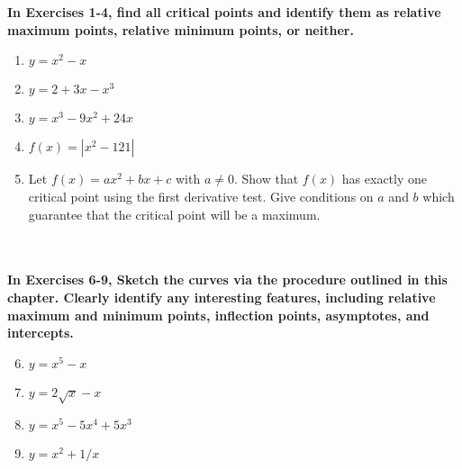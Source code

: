 \begin{exercise}
    ~\\\\\-\hspace{0.3cm} \textbf{
        In Exercises 1-4, find all critical points and identify them as relative maximum points, relative minimum points, or neither.
    }\cite{mooc}
    \begin{enumerate} 
        \item $y=x^2-x$
        \item $y=2+3x-x^3$ 
        \item $y=x^3-9x^2+24x$
        \item $f(x) = |x^2 - 121|$
        \item Let $f(x) =a x^2 + bx + c$ with $a\neq 0$. Show that $f(x)$ has exactly one critical point using the first derivative test. Give conditions on $a$ and $b$ which guarantee that the critical point will
        be a maximum. 
    \end{enumerate}
    ~\\\\\-\hspace{0.3cm} \textbf{
        In Exercises 6-9, Sketch the curves via the procedure outlined in this chapter. Clearly identify any interesting features, including relative maximum and minimum points, inflection points, asymptotes, and intercepts.
    }\cite{mooc}
    \begin{enumerate} 
        \setcounter{enumi}{5}
        \item $y= x^5 - x$
        \item $y=2\sqrt{x} - x$
        \item $y=x^5-5x^4+5x^3$
        \item $y = x^2+ 1/x$
    \end{enumerate}
\end{exercise}
